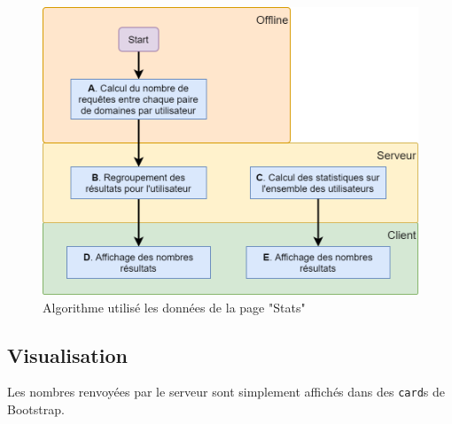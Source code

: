 		\begin{figure}[!h]
			\centering
			\includegraphics[height=0.6\textwidth]{images/design/pages/stats_algo}
			\caption{Algorithme utilisé les données de la page "Stats"}
			\label{stats_algo}
		\end{figure}

	\subsection{Visualisation}

			Les nombres renvoyées par le serveur sont simplement affichés dans des \texttt{card}s de Bootstrap.

\clearpage
